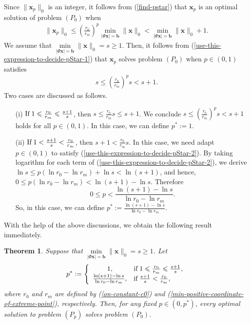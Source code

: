 \documentclass[12pt]{article}
\newtheorem{Theorem}{Theorem}[part]
\begin{document}
Since $\|{\mathbf{x}}_p\|_{0}$ is an integer, it follows from (\ref{find-pstar}) that  ${\mathbf{x}}_p$ is an optimal solution of problem $(P_0)$ when
\begin{eqnarray}\label{use-this-expression-to-decide-pStar-1}
\|{\mathbf{x}}_p\|_{0}\leqslant \left (\frac{r_0}{r_m}\right)^{p}\min\limits_{|\Phi\mathbf{x}| =\mathbf{b}}\|\mathbf{x}\|_{0}<\min\limits_{|\Phi\mathbf{x}|=\mathbf{b}}\|\mathbf{x}\|_{0}+1.
\end{eqnarray}
We assume that $\min\limits_{|\Phi\mathbf{x}|=\mathbf{b}}\|\mathbf{x}\|_{0}=s\geqslant1$. Then, it follows from (\ref{use-this-expression-to-decide-pStar-1}) that ${\mathbf{x}}_p$ solves problem $(P_0)$ when $p\in (0,1)$ satisfies
\begin{eqnarray}\label{use-this-expression-to-decide-pStar-2}
s\leqslant  \left(\frac{r_0}{r_m}\right)^{p}s<s+1.
\end{eqnarray}
Two cases are discussed as follows.
\begin{itemize}
  \item [(i)] $\mbox{\rm If}\;{1\leqslant\frac{r_0}{r_m}\leqslant\frac{s+1}{s}}$, then  ${s\leqslant\frac{r_0}{r_m}s\leqslant s+1}$. We conclude  ${s\leqslant\left(\frac{r_0}{r_m}\right)^{p}s<s+1}$ holds for all $p\in (0,1)$. In this case, we can define $p^\ast:=1$.
  \item [(ii)] $\mbox{\rm If}\;{1<\frac{s+1}{s}<\frac{r_0}{r_m}}$, then  ${s+1<\frac{r_0}{r_m}s}$. In this case, we need adapt $p\in (0,1)$  to satisfy (\ref{use-this-expression-to-decide-pStar-2}). By taking logarithm for each term of (\ref{use-this-expression-to-decide-pStar-2}), we derive $\ln s \leqslant p(\ln r_0 -\ln r_m)+\ln s<\ln (s+1)$,
      and hence, $0 \leqslant p(\ln r_0 -\ln r_m)<\ln (s+1)-\ln s$. Therefore
     $$0 \leqslant p<\frac{\ln (s+1)-\ln s}{\ln r_0 -\ln r_m}.$$
     So, in this case, we can define $p^\ast:=\frac{\ln (s+1)-\ln s}{\ln r_0 -\ln r_m}$.
\end{itemize}

With the help of the above discussions, we obtain the following result immediately.
\begin{Theorem}\label{mainresult-2}
Suppose that $\min\limits_{|\Phi\mathbf{x}|=\mathbf{b}}\|\mathbf{x}\|_{0}=s\geqslant1$.
Let
\begin{eqnarray}\label{p-star-formula}
p^\ast :=
\left\{
\begin{array}{cl}
{1}, & \mbox{\rm if}\;{1\leqslant\frac{r_0}{r_m}\leqslant\frac{s+1}{s}},\\
{\frac{\ln(s+1)-\ln s}{\ln r_0-\ln r_m}}, & \mbox{\rm if}\;{\frac{s+1}{s}<\frac{r_0}{r_m}},
\end{array}
\right.
\end{eqnarray}
where $r_0$ and $r_m$ are defined by (\ref{on-constant-c0}) and (\ref{min-positive-coordinate-of-extreme-point}), respectively.
Then,  for any fixed $p\in (0,p^\ast)$, every optimal solution to problem $(P_p)$ solves problem $(P_0)$.
\end{Theorem}
\end{document}
